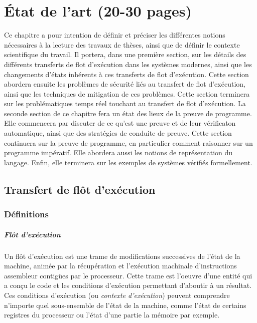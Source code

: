 \chapter{État de l'art (20-30 pages)}

	Ce chapitre a pour intention de définir et préciser les différentes notions nécessaires à la lecture des travaux de thèses, ainsi que de définir le contexte scientifique du travail. Il portera, dans une première section, sur les détails des différents transferts de flot d'exécution dans les systèmes modernes, ainsi que les changements d'états inhérents à ces transferts de flot d'exécution. Cette section abordera ensuite les problèmes de sécurité liés au transfert de flot d'exécution, ainsi que les techniques de mitigation de ces problèmes. Cette section terminera sur les problématiques temps réel touchant au transfert de flot d'exécution.
	La seconde section de ce chapitre fera un état des lieux de la preuve de programme. Elle commencera par discuter de ce qu'est une preuve et de leur vérificaton automatique, ainsi que des stratégies de conduite de preuve. Cette section continuera sur la preuve de programme, en particulier comment raisonner sur un programme impératif. Elle abordera aussi les notions de représentation du langage. Enfin, elle terminera sur les exemples de systèmes vérifiés formellement.

	\section{Transfert de flôt d'exécution}
	\label{control_flow_transfer}

		\subsection{Définitions}

		\paragraph{Flôt d'exécution}

			Un flôt d'exécution est une trame de modifications successives de l'état de la machine, animée par la récupération et l'exécution machinale d'instructions assembleur contigües par le processeur. Cette trame est l'oeuvre d'une entité qui a conçu le code et les conditions d'exécution permettant d'aboutir à un résultat. Ces conditions d'exécution (ou \emph{contexte d'exécution}) peuvent comprendre n'importe quel sous-ensemble de l'état de la machine, comme l'état de certains registres du processeur ou l'état d'une partie la mémoire par exemple.

